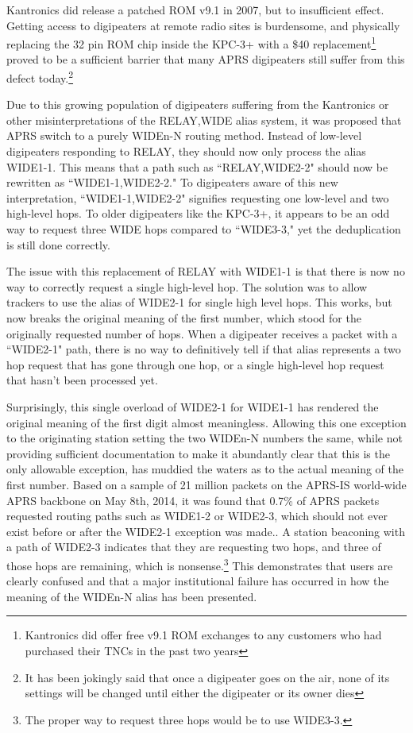Kantronics did release a patched ROM v9.1 in 2007, but to insufficient effect.
Getting access to digipeaters at remote radio sites is burdensome,
and physically replacing the 32 pin ROM chip inside the KPC-3+ 
with a \$40 replacement\footnote{Kantronics did offer free v9.1 ROM exchanges to 
any customers who had purchased their TNCs in the past two years} 
proved to be a sufficient barrier that many APRS digipeaters still
suffer from this defect today.\footnote{It has been jokingly said 
	that once a digipeater goes on the air,
	none of its settings will be changed until either the digipeater
or its owner dies}

Due to this growing population of digipeaters suffering from the Kantronics or other
misinterpretations of the RELAY,WIDE alias system, 
it was proposed that APRS switch to a purely WIDEn-N routing method. 
Instead of low-level digipeaters responding to RELAY,
they should now only process the alias WIDE1-1.
This means that a path such as ``RELAY,WIDE2-2" should now be rewritten as
``WIDE1-1,WIDE2-2." 
To digipeaters aware of this new interpretation, ``WIDE1-1,WIDE2-2" signifies 
requesting one low-level and two high-level hops.
To older digipeaters like the KPC-3+, it appears to be an odd way to request
three WIDE hops compared to ``WIDE3-3," 
yet the deduplication is still done correctly.

The issue with this replacement of RELAY with WIDE1-1 is that there is now
no way to correctly request a single high-level hop.
The solution was to allow trackers to use the alias of WIDE2-1 for single
high level hops.
This works, but now breaks the original meaning of the first number,
which stood for the originally requested number of hops.
When a digipeater receives a packet with a ``WIDE2-1" path, 
there is no way to definitively
tell if that alias represents a two hop request that has gone through one hop,
or a single high-level hop request that hasn't been processed yet.

Surprisingly, this single overload of WIDE2-1 for WIDE1-1 has rendered the
original meaning of the first digit almost meaningless.
Allowing this one exception to the originating station setting the two WIDEn-N
numbers the same, while not providing sufficient documentation
to make it abundantly clear that this is the only allowable exception,
has muddied the waters as to the actual meaning of the first number.
Based on a sample of 21 million packets on the APRS-IS world-wide APRS 
backbone on May 8th, 2014, it was found that
0.7\% of APRS packets requested routing paths such as WIDE1-2 or WIDE2-3,
which should not ever exist before or after the WIDE2-1 exception was made..
A station beaconing with a path of WIDE2-3 indicates that they are requesting
two hops, and three of those hops are remaining, which is nonsense.\footnote{The
proper way to request three hops would be to use WIDE3-3.}
This demonstrates that users are clearly confused and that a
major institutional failure has occurred in how the meaning of the WIDEn-N alias has
been presented.

